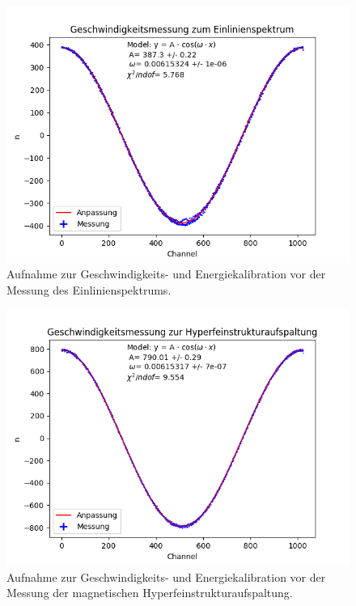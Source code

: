 \documentclass[12pt,a4paper]{article}
\begin{document}
\begin{figure} [H]
\centering
\includegraphics[scale=0.8]{Bilder/Kalibration/Einlinien.png}
\caption{Aufnahme zur Geschwindigkeits- und Energiekalibration vor der Messung des Einlinienspektrums.}
\end{figure}

\begin{figure} [H]
\centering
\includegraphics[scale=0.8]{Bilder/Kalibration/Hyperfein.png}
\caption{Aufnahme zur Geschwindigkeits- und Energiekalibration vor der Messung der magnetischen Hyperfeinstrukturaufspaltung.}
\end{figure}
\end{document}
